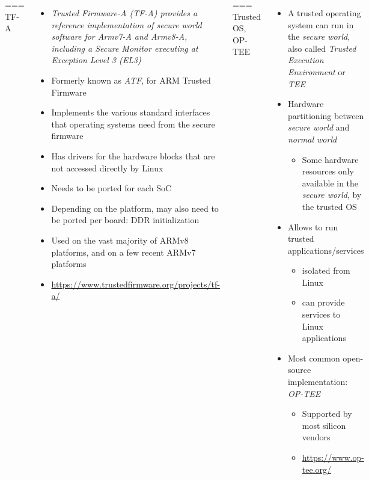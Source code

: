\begin{columns}
=== {TF-A}
  \begin{itemize}
  \item {\em Trusted Firmware-A (TF-A) provides a reference
      implementation of secure world software for Armv7-A and Armv8-A,
      including a Secure Monitor executing at Exception Level 3 (EL3)}
  \item Formerly known as {\em ATF}, for ARM Trusted Firmware
  \item Implements the various standard interfaces that operating
    systems need from the secure firmware
  \item Has drivers for the hardware blocks that are not accessed
    directly by Linux
  \item Needs to be ported for each SoC
  \item Depending on the platform, may also need to be ported per
    board: DDR initialization
  \item Used on the vast majority of ARMv8 platforms, and on a few
    recent ARMv7 platforms
  \item \url{https://www.trustedfirmware.org/projects/tf-a/}
  \end{itemize}


=== {Trusted OS, OP-TEE}
  \begin{itemize}
  \item A trusted operating system can run in the {\em secure world},
    also called {\em Trusted Execution Environment} or {\em TEE}
  \item Hardware partitioning between {\em secure world} and {\em
      normal world}
    \begin{itemize}
    \item Some hardware resources only available in the {\em secure
        world}, by the trusted OS
    \end{itemize}
  \item Allows to run trusted applications/services
    \begin{itemize}
    \item isolated from Linux
    \item can provide services to Linux applications
    \end{itemize}
  \item Most common open-source implementation: {\em OP-TEE}
    \begin{itemize}
    \item Supported by most silicon vendors
    \item \url{https://www.op-tee.org/}
    \end{itemize}
  \end{itemize}



\end{columns}
